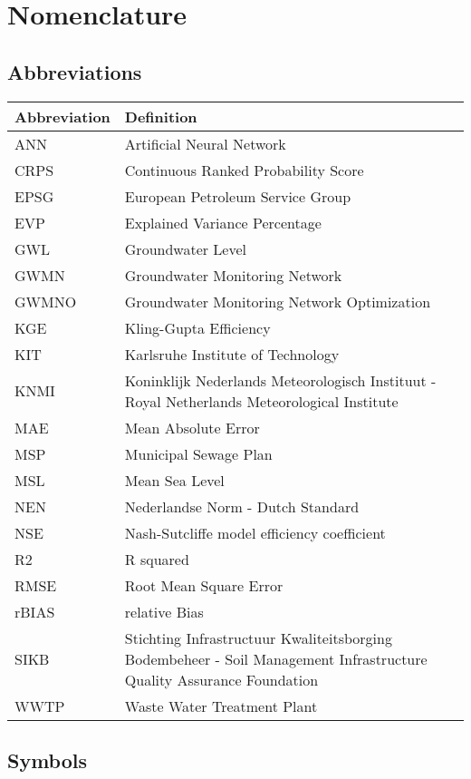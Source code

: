 \chapter*{Nomenclature}


\section*{Abbreviations}

\begin{longtable}{p{2.5cm}p{8cm}}
\toprule
Abbreviation & Definition \\
\midrule\endhead
ANN & Artificial Neural Network \\
CRPS & Continuous Ranked Probability Score\\
EPSG & European Petroleum Service Group\\
EVP & Explained Variance Percentage\\
GWL & Groundwater Level\\
GWMN & Groundwater Monitoring Network\\
GWMNO & Groundwater Monitoring Network Optimization\\
KGE & Kling-Gupta Efficiency\\
KIT & Karlsruhe Institute of Technology\\
KNMI & Koninklijk Nederlands Meteorologisch Instituut - Royal Netherlands Meteorological Institute\\
MAE & Mean Absolute Error\\
MSP & Municipal Sewage Plan\\
MSL & Mean Sea Level\\
NEN & Nederlandse Norm - Dutch Standard\\
NSE & Nash-Sutcliffe model efficiency coefficient\\
R2 & R squared\\
RMSE & Root Mean Square Error\\
rBIAS & relative Bias\\
SIKB & Stichting Infrastructuur Kwaliteitsborging Bodembeheer - Soil Management Infrastructure Quality Assurance Foundation\\
WWTP & Waste Water Treatment Plant\\
\bottomrule
\end{longtable}
\section*{Symbols}

